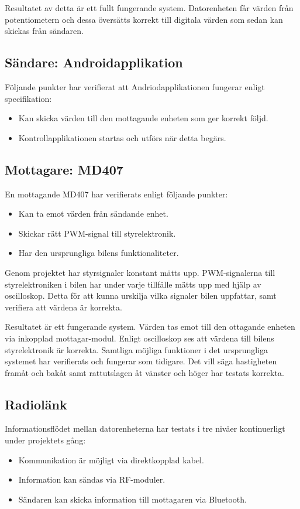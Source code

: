 \documentclass[a4paper]{article}
\begin{document}
\noindent
Resultatet av detta är ett fullt fungerande system. Datorenheten får värden från potentiometern och dessa översätts korrekt till digitala värden som sedan kan skickas från sändaren.


\subsection{Sändare: Androidapplikation}
Följande punkter har verifierat att Andriodapplikationen fungerar enligt specifikation:

\begin{itemize}
\item Kan skicka värden till den mottagande enheten som ger korrekt följd.
\item Kontrollapplikationen startas och utförs när detta begärs.
\end{itemize}




\subsection{Mottagare: MD407}
En mottagande MD407 har verifierats enligt följande punkter:

\begin{itemize}
\item Kan ta emot värden från sändande enhet.
\item Skickar rätt PWM-signal till styrelektronik.
\item Har den ursprungliga bilens funktionaliteter.
\end{itemize}

\noindent
Genom projektet har styrsignaler konstant mätts upp. PWM-signalerna till styrelektroniken i bilen har under varje tillfälle mätts upp med hjälp av oscilloskop. Detta för att kunna urskilja vilka signaler bilen uppfattar, samt verifiera att värdena är korrekta.

\vspace{5mm} \noindent
Resultatet är ett fungerande system. Värden tas emot till den ottagande enheten via inkopplad mottagar-modul. Enligt oscilloskop ses att värdena till bilens styrelektronik är korrekta. Samtliga möjliga funktioner i det ursprungliga systemet har verifierats och fungerar som tidigare. Det vill säga hastigheten framåt och bakåt samt rattutslagen åt vänster och höger har testats korrekta.


\subsection{Radiolänk}
Informationsflödet mellan datorenheterna har testats i tre nivåer kontinuerligt under projektets gång:
\begin{itemize}
\item Kommunikation är möjligt via direktkopplad kabel.
\item Information kan sändas via RF-moduler.
\item Sändaren kan skicka information till mottagaren via Bluetooth.
\end{itemize}
\end{document}
